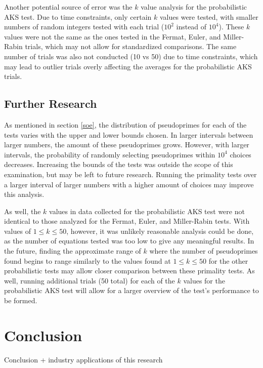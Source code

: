 \documentclass{article}
\begin{document}
Another potential source of error was the $k$ value analysis for the probabilistic AKS test. Due to time constraints, only certain $k$ values were tested, with smaller numbers of random integers tested with each trial ($10^2$ instead of $10^4$). These $k$ values were not the same as the ones tested in the Fermat, Euler, and Miller-Rabin trials, which may not allow for standardized comparisons. The same number of trials was also not conducted (10 vs 50) due to time constraints, which may lead to outlier trials overly affecting the averages for the probabilistic AKS trials.

\subsection{Further Research}
As mentioned in section \ref{soe}, the distribution of pseudoprimes for each of the tests varies with the upper and lower bounds chosen. In larger intervals between larger numbers, the amount of these pseudoprimes grows. However, with larger intervals, the probability of randomly selecting pseudoprimes within $10^4$ choices decreases. Increasing the bounds of the tests was outside the scope of this examination, but may be left to future research. Running the primality tests over a larger interval of larger numbers with a higher amount of choices may improve this analysis. 

As well, the $k$ values in data collected for the probabilistic AKS test were not identical to those analyzed for the Fermat, Euler, and Miller-Rabin tests. With values of $1 \leq k \leq 50$, however, it was unlikely reasonable analysis could be done, as the number of equations tested was too low to give any meaningful results. In the future, finding the approximate range of $k$ where the number of pseudoprimes found begins to range similarly to the values found at $1 \leq k \leq 50$ for the other probabilistic tests may allow closer comparison between these primality tests. As well, running additional trials (50 total) for each of the $k$ values for the probabilistic AKS test will allow for a larger overview of the test's performance to be formed.

\section{Conclusion}
Conclusion + industry applications of this research

\nocite{*}


\end{document}
